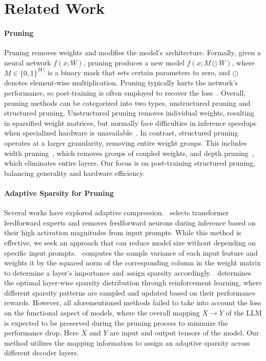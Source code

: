 \section{Related Work}
\label{sec:Related Work}

\paragraph{Pruning} Pruning removes weights and modifies the model's architecture. Formally, given a neural network $f(x;W)$, pruning produces a new model $f(x;M \odot W)$, where $M \in \{0,1\}^{|W|}$ is a binary mask that sets certain parameters to zero, and $\odot$ denotes element-wise multiplication. Pruning typically hurts the network's performance, so post-training is often employed to recover the loss~\citep{MLSYS2020_6c44dc73}. Overall, pruning methods can be categorized into two types, unstructured pruning and structured pruning. Unstructured pruning removes individual weights, resulting in sparsified weight matrices, but normally face difficulties in inference speedups when specialized hardware is unavailable~\citep{dery2024everybodyprunenowstructured}. In contrast, structured pruning operates at a larger granularity, removing entire weight groups. This includes width pruning~\citep{llm-pruner, SliceGPT}, which removes groups of coupled weights, and depth pruning~\citep{kim2024shortenedllamadepthpruning, siddiqui2024deeperlookdepthpruning}, which eliminates entire layers. Our focus is on post-training structured pruning, balancing generality and hardware efficiency.

\paragraph{Adaptive Sparsity for Pruning} Several works have explored adaptive compression.~\citet{dong2024prompt} selects transformer feedforward experts and removes feedforward neurons during inference based on their high activation magnitudes from input prompts. While this method is effective, we seek an approach that can reduce model size without depending on specific input prompts.~\citet{FLAP} computes the sample variance of each input feature and weights it by the squared norm of the corresponding column in the weight matrix to determine a layer’s importance and assign sparsity accordingly.~\citet{RLPruner} determines the optimal layer-wise sparsity distribution through reinforcement learning, where different sparsity patterns are sampled and updated based on their performance rewards. However, all aforementioned methods failed to take into account the loss on the functional aspect of models, where the overall mapping $X \rightarrow Y$ of the LLM is expected to be preserved during the pruning process to minimize the performance drop. Here $X$ and $Y$ are input and output tensors of the model. Our method utilizes the mapping information to assign an adaptive sparsity across different decoder layers.

